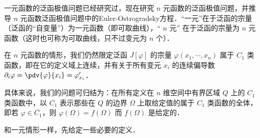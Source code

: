 
一元函数的泛函极值问题已经研究过，现在研究 $n$ 元函数的泛函极值问题，并推导 $n$ 元函数泛函极值问题中的Euler-Ostrogradsky方程．“一元”在于泛函的宗量（泛函的“自变量”）为一元函数（即可取曲线），“ $n$ 元” 在于泛函的宗量为 $n$ 元函数（这时也可称为可取曲线，只不过变元为 $n$ 个）．

在 $n$ 元函数的情形，我们仍然限定泛函 $J[\varphi]$ 的宗量 $\varphi(x_1,\cdots,x_n)$ 属于 $C_1$ 类函数，即在它的定义域上连续，并有关于所有变元 $x_i$ 的连续偏导数 $\partial_i\varphi=\pdv{\varphi}{x_i}=\varphi'_{x_i}$．

具体来说，我们的问题可归结为：在所有定义在 $n$ 维空间中有界区域 $Q$ 上的 $C_1$ 类函数中，以 $\overline{C_1}$ 表示那些在 $Q$ 的边界 $\Omega$ 上取给定值的属于 $C_1$ 类函数的全体，即若 $\varphi\in\overline{C_1}$，则 $\varphi(\Omega)=f(\Omega)$ 而 $f(\Omega)$ 是给定的．

和一元情形一样，先给定一些必要的定义．

